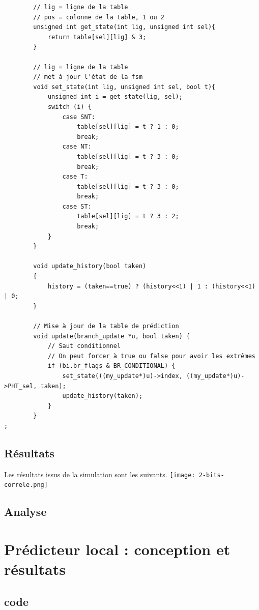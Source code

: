 \documentclass[a4paper]{article}
\begin{document}
\begin{verbatim}
		// lig = ligne de la table 
		// pos = colonne de la table, 1 ou 2
		unsigned int get_state(int lig, unsigned int sel){
			return table[sel][lig] & 3;
		}

		// lig = ligne de la table 
		// met à jour l'état de la fsm
		void set_state(int lig, unsigned int sel, bool t){
			unsigned int i = get_state(lig, sel);
			switch (i) {
				case SNT:
					table[sel][lig] = t ? 1 : 0;
					break;
				case NT:
					table[sel][lig] = t ? 3 : 0;
					break;
				case T:
					table[sel][lig] = t ? 3 : 0;
					break;
				case ST:
					table[sel][lig] = t ? 3 : 2;
					break;
			}
		}

		void update_history(bool taken)
		{
			history = (taken==true) ? (history<<1) | 1 : (history<<1) | 0;
		}

		// Mise à jour de la table de prédiction
		void update(branch_update *u, bool taken) {
			// Saut conditionnel
			// On peut forcer à true ou false pour avoir les extrêmes
			if (bi.br_flags & BR_CONDITIONAL) {
				set_state(((my_update*)u)->index, ((my_update*)u)->PHT_sel, taken);
				update_history(taken);
			}
		}
;
\end{verbatim}
\normalsize

\subsection{Résultats}

Les résultats issus de la simulation sont les suivants.
\texttt{[image: 2-bits-correle.png]}

\subsection{Analyse}

\section{Prédicteur local : conception et résultats}
\subsection{code}
\end{document}
